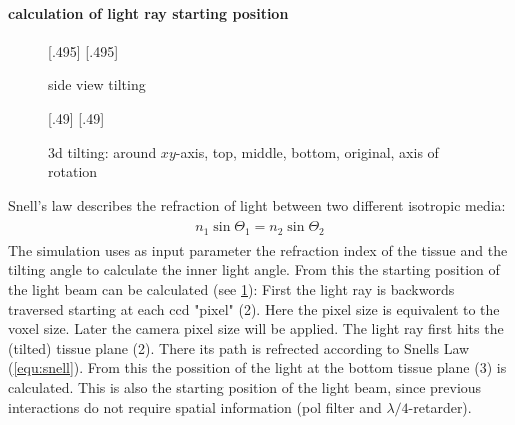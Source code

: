\paragraph{calculation of light ray starting position}
% 
\begin{figure}[!t]
\def\tikzwidth{0.42\textwidth}
% 
[.495\textwidth]{
\def\tilt{0}
\def\nindex{2.25}
}
% 
[.495\textwidth]{
}
\caption{side view tilting}
\label{fig:tilted_side_view}
\end{figure}
% 
\begin{figure}[!t]
% 
\def\tikzheight{0.42\textwidth}
{}[.49\textwidth]{
}
% 
[.49\textwidth]{
}
% 
\tikzset{external/export=false}
\caption[3d tilting]{3d tilting: around $xy$-axis, \raisebox{.25em}{\tikz \draw[red,thick](0,0)--(0.25,0);} top, \raisebox{.25em}{\tikz \draw[green!50!black,thick](0,0)--(0.25,0);} middle, \raisebox{.25em}{\tikz \draw[blue,thick](0,0)--(0.25,0);} bottom, \raisebox{.25em}{\tikz \draw[dash pattern=on 1.25pt off 1.25pt,thick](0,0)--(0.25,0);} original, \raisebox{.25em}{\tikz \draw[gray](0,0)--(0.25,0);} axis of rotation }
\end{figure}
% 
Snell's law describes the refraction of light between two different isotropic media:
\begin{align}
\begin{split}
    n_1 \sin{\Theta_1} = n_2 \sin{\Theta_2}
\end{split}
\label{equ:snell}
\end{align}
% 
The simulation uses as input parameter the refraction index of the tissue and the tilting angle to calculate the inner light angle.
From this the starting position of the light beam can be calculated (see \cref{fig:tilted_side_view}):
% 
First the light ray is backwords traversed starting at each ccd "pixel" (2).
Here the pixel size is equivalent to the voxel size.
Later the camera pixel size will be applied.
The light ray first hits the (tilted) tissue plane (2).
There its path is refrected according to Snells Law (\cref{equ:snell}).
From this the possition of the light at the bottom tissue plane (3) is calculated.
This is also the starting position of the light beam, since previous interactions do not require spatial information (\ie pol filter and $\lambda/4$-retarder).\\
